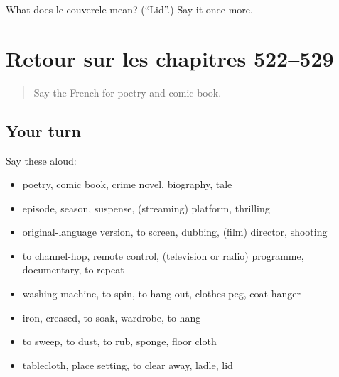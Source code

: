 \begin{tcolorbox}[breakable,colback=teal!4,colframe=teal!35!black,title={Before you move on}]
What does le couvercle mean? (\textquotedblleft{}Lid\textquotedblright{}.) Say it once more.
\end{tcolorbox}
\section[(dialogue)]{Retour sur les chapitres 522–529}

\label{lesson:FR-R529-revision-522-529}



\begin{quote}
Say the French for poetry and comic book.
\end{quote}

\subsection*{Your turn}
Say these aloud:

\begin{itemize}
\raggedright
  \item poetry, comic book, crime novel, biography, tale
  \item episode, season, suspense, (streaming) platform, thrilling
  \item original-language version, to screen, dubbing, (film) director, shooting
  \item to channel-hop, remote control, (television or radio) programme, documentary, to repeat
  \item washing machine, to spin, to hang out, clothes peg, coat hanger
  \item iron, creased, to soak, wardrobe, to hang
  \item to sweep, to dust, to rub, sponge, floor cloth
  \item tablecloth, place setting, to clear away, ladle, lid
\end{itemize}

